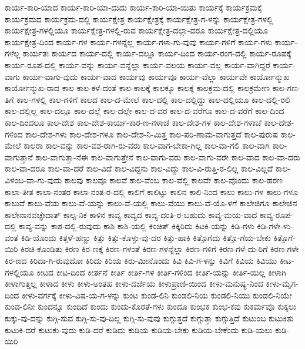 {ಕಾರ್ಯ-ಕಾರಿ-ಯಾದ
ಕಾರ್ಯ-ಕಾರಿ-ಯಾ-ದುದು
ಕಾರ್ಯ-ಕಾರಿ-ಯಾ-ಯಿತು
ಕಾರ್ಯಕ್ಕೆ
ಕಾರ್ಯಕ್ರಮಕ್ಕೆ
ಕಾರ್ಯಕ್ರಮದ
ಕಾರ್ಯಕ್ರಮ-ದಲ್ಲಿ
ಕಾರ್ಯಕ್ಷೇತ್ರ
ಕಾರ್ಯಕ್ಷೇತ್ರಕ್ಕೆ
ಕಾರ್ಯಕ್ಷೇತ್ರ-ಗ-ಳನ್ನು
ಕಾರ್ಯಕ್ಷೇತ್ರ-ಗಳಲ್ಲಿ
ಕಾರ್ಯಕ್ಷೇತ್ರ-ಗಳಲ್ಲಿಯೂ
ಕಾರ್ಯಕ್ಷೇತ್ರ-ಗಳಲ್ಲಿ-ರುವ
ಕಾರ್ಯಕ್ಷೇತ್ರ-ದಲ್ಲಾ-ದರೂ
ಕಾರ್ಯಕ್ಷೇತ್ರ-ದಲ್ಲಿಯೂ
ಕಾರ್ಯಕ್ಷೇತ್ರ-ದಿಂದ
ಕಾರ್ಯ-ಗಳ
ಕಾರ್ಯ-ಗಳನ್ನೆಲ್ಲ
ಕಾರ್ಯ-ಗಳಾ-ಗು-ವುವು
ಕಾರ್ಯ-ಗಳಿಗೆ
ಕಾರ್ಯ-ಗಳು
ಕಾರ್ಯ-ಗಳೆಲ್ಲ
ಕಾರ್ಯತಃ
ಕಾರ್ಯದ
ಕಾರ್ಯ-ದಲ್ಲಿ
ಕಾರ್ಯ-ದಲ್ಲೂ
ಕಾರ್ಯ-ದಿಂದ
ಕಾರ್ಯ-ರಂಗ-ದಲ್ಲಿ
ಕಾರ್ಯ-ರೂಪಕ್ಕೆ
ಕಾರ್ಯ-ರೂಪ-ದಲ್ಲಿ
ಕಾರ್ಯ-ವನ್ನು
ಕಾರ್ಯ-ವನ್ನೆಲ್ಲಾ
ಕಾರ್ಯ-ವಲಯ
ಕಾರ್ಯ-ವಲ್ಲ
ಕಾರ್ಯ-ವಾಗಿದ್ದರೆ
ಕಾರ್ಯ-ವಾಗು
ಕಾರ್ಯ-ವಾಗು-ವುದು
ಕಾರ್ಯ-ವಾದ
ಕಾರ್ಯವು
ಕಾರ್ಯವೂ
ಕಾರ್ಯ-ವೆಲ್ಲಾ
ಕಾರ್ಯವೇ
ಕಾರ್ಯೋನ್ಮುಖ
ಕಾರ್ಯೋನ್ಮುಖ-ರಾದ
ಕಾಲ
ಕಾಲ-ಕಳೆ-ದಂತೆ
ಕಾಲ-ಕಾಲಕ್ಕೆ
ಕಾಲಕ್ಕೂ
ಕಾಲಕ್ಕೆ
ಕಾಲಕ್ರಮ-ದಲ್ಲಿ
ಕಾಲಕ್ರಮೇಣ
ಕಾಲ-ಗಣ-ತಿಗೆ
ಕಾಲ-ಗಳಲ್ಲಿ
ಕಾಲ-ಗಳಿಗೆ
ಕಾಲದ
ಕಾಲ-ದ-ಮೇಲೆ
ಕಾಲ-ದಲ್ಲಿ
ಕಾಲ-ದಲ್ಲಿದ್ದು
ಕಾಲ-ದಲ್ಲಿಯೂ
ಕಾಲ-ದಲ್ಲಿ-ರಲಿ
ಕಾಲ-ದಲ್ಲಿಲ್ಲ
ಕಾಲ-ದಲ್ಲೂ
ಕಾಲ-ದಲ್ಲೆ
ಕಾಲ-ದಲ್ಲೇ
ಕಾಲ-ದ-ವರ
ಕಾಲ-ದ-ವರೆಗೂ
ಕಾಲ-ದ-ವರೆಗೆ
ಕಾಲ-ದಿಂದ
ಕಾಲ-ದಿಂದಲೂ
ಕಾಲ-ದೇಶ
ಕಾಲ-ದೇಶ-ಕಾರ್ಯ-ಕಾರ-ಣ-ಗಳಾಚೆ
ಕಾಲ-ದೇಶ-ಗಳ
ಕಾಲ-ದೇಶ-ಗಳಾಚೆ
ಕಾಲ-ದೇಶ-ಗಳಿಂದ
ಕಾಲ-ದೇಶ-ಗಳು
ಕಾಲ-ದೇಶ-ಗಳೂ
ಕಾಲ-ದೇಶ-ನಿ-ಮಿತ್ತ
ಕಾಲ-ಪರಿ-ಣಾಮ-ವಾಗುತ್ತದೆ
ಕಾಲ-ಪುರುಷ
ಕಾಲ-ಮೇಲೆ
ಕಾಲರಾ
ಕಾಲ-ವನ್ನು
ಕಾಲ-ವಶ-ರಾಗಿ-ರು-ವರು
ಕಾಲ-ವಾಗ-ಬೇಕಾ-ಗಿಲ್ಲ
ಕಾಲ-ವಾ-ಗಲಿ
ಕಾಲ-ವಾಗಿ
ಕಾಲ-ವಾಗುತ್ತಾನೆ
ಕಾಲ-ವಾಗುತ್ತಾ-ನೆಈ
ಕಾಲ-ವಾಗುತ್ತೇನೆ
ಕಾಲ-ವಾಗು-ವರು
ಕಾಲ-ವಾಗು-ವರೇ
ಕಾಲ-ವಾದ
ಕಾಲ-ವಾ-ದರು
ಕಾಲ-ವಾ-ದರೂ
ಕಾಲ-ವಾ-ದರೆ
ಕಾಲ-ವಿದೆ
ಕಾಲ-ವಿದ್ದನು
ಕಾಲ-ವಿದ್ದು
ಕಾಲ-ವಿ-ರುತ್ತಿ-ರ-ಲಿಲ್ಲ
ಕಾಲ-ವಿಲ್ಲದೆ
ಕಾಲ-ವಿಳಂಬ-ವಾ-ಗು-ವುದು
ಕಾಲವು
ಕಾಲವೂ
ಕಾಲವೆ
ಕಾಲ-ವೆಂಬ
ಕಾಲ-ವೆಲ್ಲಿ
ಕಾಲವೇ
ಕಾಲ-ವೊಂದು
ಕಾಲ-ಹರಣ
ಕಾಲಾ-ತೀತ
ಕಾಲಾ-ನಂತರ
ಕಾಲಾ-ನಂತ-ರ-ದಲ್ಲಿ
ಕಾಲಿಗೆ
ಕಾಲಿಟ್ಟು
ಕಾಲಿನ
ಕಾಲಿ-ನಿಂದ
ಕಾಲು
ಕಾಲು-ಗಳ
ಕಾಲು-ಗಳೂ
ಕಾಲುವೆ
ಕಾಲು-ವೆಯ
ಕಾಲು-ವೆ-ಯನ್ನು
ಕಾಲು-ವೆ-ಯಲ್ಲಿ
ಕಾಲು-ವೆಯು
ಕಾಲು-ವೆ-ಯೊ-ಳಗೆ
ಕಾಲೇಜಿಗೂ
ಕಾಲೇಜಿನ
ಕಾಲೇನಾನವಚ್ಛೇದಾತ್
ಕಾಲ್ಪ-ನಿಕ
ಕಾಳಿನ
ಕಾವ್ಯ
ಕಾವ್ಯದ
ಕಾವ್ಯ-ದಂತಿ-ರ-ಬಹುದು
ಕಾವ್ಯ-ಮಯ-ವಾದ
ಕಾವ್ಯ-ರೂಪ-ದಲ್ಲಿ
ಕಾವ್ಯ-ವನ್ನು
ಕಾಶ-ದಲ್ಲಿ-ರುವುದು
ಕಾಶಿ
ಕಾಶಿ-ಯಲ್ಲಿ
ಕಿಂಚಿತ್
ಕಿಕ್ಕಿರಿದು
ಕಿಟಕಿ-ಯನ್ನು
ಕಿಡಿ-ಗಳು
ಕಿಡಿ-ಗಳೇ-ಳು-ವಂತೆ
ಕಿಡಿ-ಯೊಂದು
ಕಿತ್ತಳೆ-ಹಣ್ಣು
ಕಿತ್ತು
ಕಿತ್ತು-ಕೊಳ್ಳು-ವು-ದರ
ಕಿತ್ತು-ಹಾಕಿ
ಕಿತ್ತೊಗೆದು
ಕಿತ್ತೊ-ಗೆಯ-ಬೇಕು
ಕಿತ್ತೊಗೆ-ಯಿರಿ
ಕಿರಚಿ-ಕೊಂಡಿತು
ಕಿರಣ
ಕಿರ-ಣಕ್ಕೆ
ಕಿರಣ-ಗಳಂತೆ
ಕಿರಣ-ಗಳನ್ನೆಲ್ಲಾ
ಕಿರಣ-ಗಳಿಗೆ
ಕಿರಣ-ಗಳೆ-ದು-ರಿಗೆ
ಕಿರಣ-ಗಳೇ
ಕಿರ-ಣದ
ಕಿರಿದಾ-ಗಿ-ರುವುದೋ
ಕಿರಿದು
ಕಿರಿಯ
ಕಿರು-ಮೀನೊಂದು
ಕಿವಿ
ಕಿವಿ-ಗ-ಳನ್ನು
ಕಿವಿಗೆ
ಕಿವಿಯ
ಕಿವಿಯು
ಕೀಟ-ಗಳಲ್ಲಿಯೂ
ಕೀಟದ
ಕೀಟ-ದಿಂದ
ಕೀರ್ತನೆ
ಕೀರ್ತಿ
ಕೀರ್ತಿ-ಗಳ
ಕೀರ್ತಿ-ಗಳಿಂದ
ಕೀರ್ತಿ-ಯನ್ನು
ಕೀರ್ತಿ-ಯಿಲ್ಲ
ಕೀಳಾಗಿ
ಕೀಳಾಗುತ್ತಿಲ್ಲ
ಕೀಳಾದ
ಕೀಳು
ಕೀಳು-ಅಂತಹ
ಕೀಳು-ದರ್ಜೆಯ
ಕೀಳುಪ್ರಾಣಿ-ಯಿಂದ
ಕೀಳು-ಮನುಷ್ಯ-ನಿಂದ
ಕೀಳು-ಮೃಗ-ದಿಂದ
ಕೀಳು-ವರ್ಗಕ್ಕೆ
ಕೀಳು-ವಿಷ-ಯ-ಗ-ಳನ್ನು
ಕುಂಟ
ಕುಂಡ-ಲಿನಿ
ಕುಂಡಲಿ-ನಿಯ
ಕುಂಡಲಿ-ನಿಯು
ಕುಂಡಲಿ-ನಿಯೇ
ಕುಂಡ-ಲಿನೀ
ಕುಂದನ್ನೂ
ಕುಂದಿದೆ
ಕುಂದು
ಕುಂದು-ಕೊರತೆ-ಗಳು
ಕುಂದೂ
ಕುಂಭಕ
ಕುಂಭ-ಕವು
ಕುಕರ್ಮವೊ
ಕುಕ್ಕಲು
ಕುಕ್ಕು-ವು-ದನ್ನು
ಕುಗ್ಗಿ-ಸುವ
ಕುಗ್ಗಿ-ಸು-ವು-ದಿಲ್ಲ
ಕುಗ್ಗಿ-ಸು-ವುವು
ಕುಗ್ಗುತ್ತದೆ
ಕುಗ್ಗುತ್ತಾ
ಕುಗ್ಗುತ್ತಿದೆ
ಕುಟುಂಬ
ಕುಟುಕಿತು
ಕುಟುಕಿ-ದರೆ
ಕುಟುಕು-ವುದು
ಕುಡಿ-ದರೆ
ಕುಡಿದು
ಕುಡಿಯ
ಕುಡಿಯ-ಬೇಕು
ಕುಡಿಯ-ಬೇಕೆಂದು
ಕುಡಿ-ಯಲು
ಕುಡಿ-ಯಿರಿ
}
